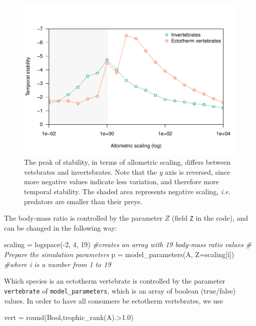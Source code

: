 \documentclass[12pt]{article}
\newenvironment{Shaded}{}{}
\newcommand{\DataTypeTok}[1]{{{#1}}}
\newcommand{\FloatTok}[1]{{{#1}}}
\newcommand{\CommentTok}[1]{\textcolor[rgb]{0.38,0.63,0.69}{\textit{{#1}}}}
\newcommand{\NormalTok}[1]{{#1}}
\begin{document}
\begin{figure}[bt]
    \centering
    \includegraphics[width=\columnwidth]{figures/vertebrate.pdf}
    \caption[Stability as a function of organism type and allometric scaling.]{The peak of stability, in terms of allometric scaling, differs between vetebrates and invertebrates. Note that the \emph{y} axis is reversed, since more negative values indicate less variation, and therefore more temporal stability. The shaded area represents negative scaling, \emph{i.e.} predators are smaller than their preys.}
    \label{vertebrate}
\end{figure}

The body-mass ratio is controlled by the parameter \(Z\) (field
\texttt{Z} in the code), and can be changed in the following way:

\begin{Shaded}
\begin{Highlighting}[]
\NormalTok{scaling = logspace(-}\FloatTok{2}\NormalTok{, }\FloatTok{4}\NormalTok{, }\FloatTok{19}\NormalTok{) }\CommentTok{#creates an array with 19 body-mass ratio values}
\CommentTok{# Prepare the simulation parameters}
\NormalTok{p = model_parameters(A, Z=scaling[i]) }\CommentTok{#where i is a number from 1 to 19}
\end{Highlighting}
\end{Shaded}

Which species is an ectotherm vertebrate is controlled by the parameter
\texttt{vertebrate} of \texttt{model\_parameters}, which is an array of
boolean (true/false) values. In order to have all consumers be ectotherm
vertebrates, we use

\begin{Shaded}
\begin{Highlighting}[]
\NormalTok{vert = round(}\DataTypeTok{Bool}\NormalTok{,trophic_rank(A).>}\FloatTok{1.0}\NormalTok{)}
\end{Highlighting}
\end{Shaded}
\end{document}
